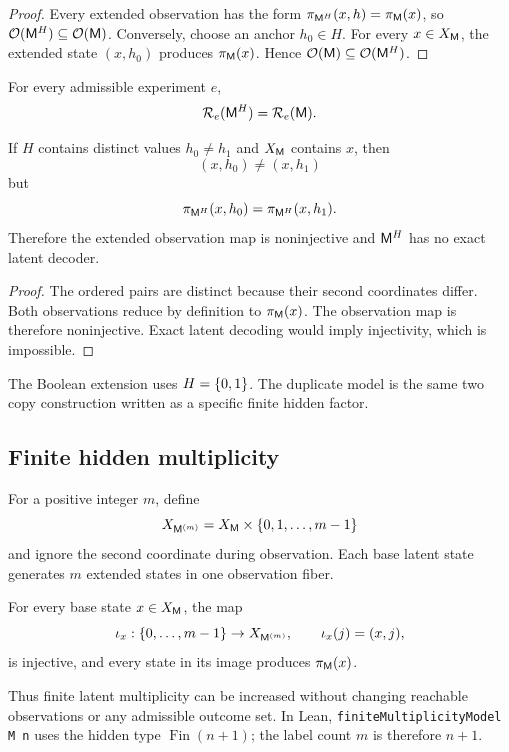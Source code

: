 \begin{proof}
Every extended observation has the form \(\pi_{\mathsf M^H}(x,h)=\pi_\mathsf M(x)\), so \(\mathcal O(\mathsf M^H)\subseteq\mathcal O(\mathsf M)\). Conversely, choose an anchor \(h_0\in H\). For every \(x\in X_\mathsf M\), the extended state \((x,h_0)\) produces \(\pi_\mathsf M(x)\). Hence \(\mathcal O(\mathsf M)\subseteq\mathcal O(\mathsf M^H)\).
\end{proof}
\begin{corollary}
For every admissible experiment \(e\),
\[
\mathcal R_e(\mathsf M^H)=\mathcal R_e(\mathsf M).
\]
\end{corollary}
\begin{theorem}
If \(H\) contains distinct values \(h_0\neq h_1\) and \(X_\mathsf M\) contains \(x\), then
\[
(x,h_0)\neq(x,h_1)
\]
but
\[
\pi_{\mathsf M^H}(x,h_0)=\pi_{\mathsf M^H}(x,h_1).
\]
Therefore the extended observation map is noninjective and \(\mathsf M^H\) has no exact latent decoder.
\end{theorem}

\begin{proof}
The ordered pairs are distinct because their second coordinates differ. Both observations reduce by definition to \(\pi_\mathsf M(x)\). The observation map is therefore noninjective. Exact latent decoding would imply injectivity, which is impossible.
\end{proof}
The Boolean extension uses \(H=\{0,1\}\). The duplicate model is the same two copy construction written as a specific finite hidden factor.

\subsection{Finite hidden multiplicity}

For a positive integer \(m\), define
\[
X_{\mathsf M^{(m)}}=X_\mathsf M\times\{0,1,\ldots,m-1\}
\]
and ignore the second coordinate during observation. Each base latent state generates \(m\) extended states in one observation fiber.

\begin{proposition}
For every base state \(x\in X_\mathsf M\), the map
\[
\iota_x:\{0,\ldots,m-1\}\to X_{\mathsf M^{(m)}},
\qquad
\iota_x(j)=(x,j),
\]
is injective, and every state in its image produces \(\pi_\mathsf M(x)\).
\end{proposition}
Thus finite latent multiplicity can be increased without changing reachable observations or any admissible outcome set. In Lean, \texttt{finiteMultiplicityModel M n} uses the hidden type \(\operatorname{Fin}(n+1)\); the label count \(m\) is therefore \(n+1\).

